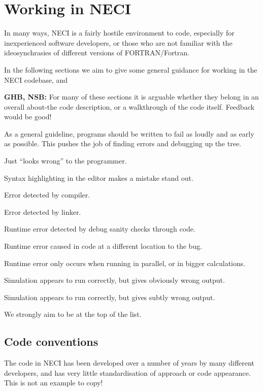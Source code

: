 \documentclass[a4paper,notitlepage]{scrreprt}
\newenvironment{packed_enum}{
	\begin{enumerate}
		\setlength{\itemsep}{1pt}
		\setlength{\parskip}{0pt}
		\setlength{\parsep}{0pt}
	}{\end{enumerate}}
\begin{document}
\chapter{Working in NECI}
In many ways, NECI is a fairly hostile environment to code, especially for
inexperienced software developers, or those who are not familiar with the
ideosynchrasies of different versions of FORTRAN/Fortran.

In the following sections we aim to give some general guidance for working in
the NECI codebase, and

\textbf{GHB, NSB:} For many of these sections it is arguable whether they
belong in an overall about-the code description, or a walkthrough of the code
itself. Feedback would be good!

\begin{mdframed}[ %
	linewidth = 2pt, %
	linecolor = red, %
	roundcorner = 6pt, %
	leftmargin = 10, %
	rightmargin = 10, %
	backgroundcolor = gray!20
]
As a general guideline, programs should be written to fail as loudly and as
early as possible. This pushes the job of finding errors and debugging up
the tree.

\begin{packed_enum}
	\item Just ``looks wrong'' to the programmer.
	\item Syntax highlighting in the editor makes a mistake stand out.
	\item Error detected by compiler.
	\item Error detected by linker.
	\item Runtime error detected by debug sanity checks through code.
	\item Runtime error caused in code at a different location to the bug.
	\item
		Runtime error only occurs when running in parallel, or in bigger
		calculations.
	\item
		Simulation appears to run correctly, but gives obviously wrong output.
	\item
		Simulation appears to run correctly, but gives subtly wrong output.
\end{packed_enum}
We strongly aim to be at the top of the list.
\end{mdframed}

\section{Code conventions}
The code in NECI has been developed over a number of years by many different
developers, and has very little standardisation of approach or code appearance.
This is not an example to copy!
\end{document}
